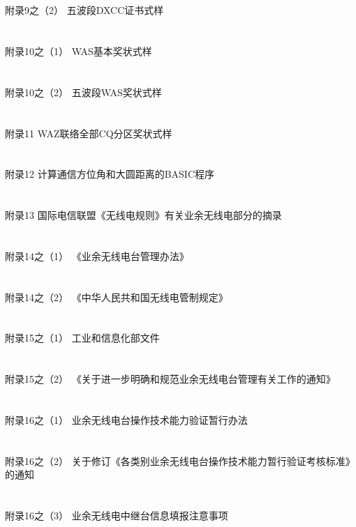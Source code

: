 \documentclass[12pt,UTF8]{ctexbook}
\begin{document}
\section{}附录9之（2） 五波段DXCC证书式样
\section{}附录10之（1） WAS基本奖状式样
\section{}附录10之（2） 五波段WAS奖状式样
\section{}附录11 WAZ联络全部CQ分区奖状式样
\section{}附录12 计算通信方位角和大圆距离的BASIC程序
\section{}附录13 国际电信联盟《无线电规则》有关业余无线电部分的摘录
\section{}附录14之（1） 《业余无线电台管理办法》
\section{}附录14之（2） 《中华人民共和国无线电管制规定》
\section{}附录15之（1） 工业和信息化部文件
\section{}附录15之（2） 《关于进一步明确和规范业余无线电台管理有关工作的通知》
\section{}附录16之（1） 业余无线电台操作技术能力验证暂行办法
\section{}附录16之（2） 关于修订《各类别业余无线电台操作技术能力暂行验证考核标准》的通知
\section{}附录16之（3） 业余无线电中继台信息填报注意事项
\end{document}
